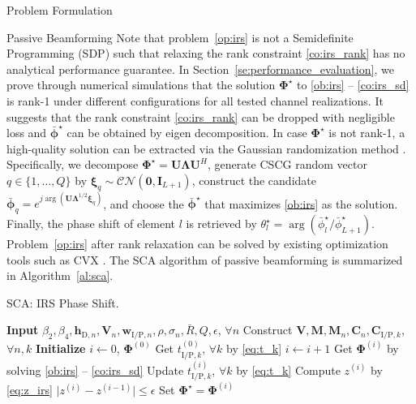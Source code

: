 \documentclass[journal]{IEEEtran}
\begin{document}
\begin{section}{Problem Formulation}
\begin{subsection}{Passive Beamforming}
			Note that problem~\eqref{op:irs} is not a Semidefinite Programming (SDP) such that relaxing the rank constraint \eqref{co:irs_rank} has no analytical performance guarantee. In Section~\ref{se:performance_evaluation}, we prove through numerical simulations that the solution $\boldsymbol{\Phi}^{\star}$ to \ref{ob:irs} -- \ref{co:irs_sd} is rank-\num{1} under different configurations for all tested channel realizations. It suggests that the rank constraint \eqref{co:irs_rank} can be dropped with negligible loss and $\bar{\boldsymbol{\phi}}^\star$ can be obtained by eigen decomposition. In case $\boldsymbol{\Phi}^{\star}$ is not rank-\num{1}, a high-quality solution can be extracted via the Gaussian randomization method \cite{Luo2010}. Specifically, we decompose $\boldsymbol{\Phi}^{\star}=\boldsymbol{U}\boldsymbol{\Lambda}\boldsymbol{U}^H$, generate CSCG random vector $q \in \{1, \dots, Q\}$ by $\boldsymbol{\xi}_q \sim \mathcal{CN}(\boldsymbol{0},\boldsymbol{I}_{L+1})$, construct the candidate $\bar{\boldsymbol{\phi}}_q=e^{j\arg\left(\boldsymbol{U}\boldsymbol{\Lambda}^{1/2}\boldsymbol{\xi}_q\right)}$, and choose the $\bar{\boldsymbol{\phi}}^\star$ that maximizes \eqref{ob:irs} as the solution. Finally, the phase shift of element $l$ is retrieved by $\theta_l^{\star}=\arg(\bar{\phi}_l^\star/\bar{\phi}_{L+1}^\star)$. Problem~\eqref{op:irs} after rank relaxation can be solved by existing optimization tools such as CVX \cite{Grant2013}. The SCA algorithm of passive beamforming is summarized in Algorithm~\ref{al:sca}.
			\begin{algorithm}[!t]
				\caption{SCA: IRS Phase Shift.}
				\label{al:sca}
				\begin{algorithmic}[1]
					\State \textbf{Input} $\beta_2,\beta_4,\boldsymbol{h}_{\mathrm{D},n},\boldsymbol{V}_{n},\boldsymbol{w}_{\mathrm{I/P},n},\rho,\sigma_n,\bar{R},Q,\epsilon$, $\forall n$
					\State Construct $\boldsymbol{V},\boldsymbol{M},\boldsymbol{M}_n,\boldsymbol{C}_{n},\boldsymbol{C}_{\mathrm{I/P},k}$, $\forall n,k$
					\State \textbf{Initialize} $i \gets 0$, $\boldsymbol{\Phi}^{(0)}$
					\State Get $t_{\mathrm{I/P},k}^{(0)}$, $\forall k$ by \eqref{eq:t_k}
					\Repeat
						\State $i \gets i + 1$
						\State Get $\boldsymbol{\Phi}^{(i)}$ by solving \ref{ob:irs} -- \ref{co:irs_sd}
						\State Update $t_{\mathrm{I/P},k}^{(i)}$, $\forall k$ by \eqref{eq:t_k}
						\State Compute $z^{(i)}$ by \eqref{eq:z_irs}
					\Until $\lvert z^{(i)}-z^{(i-1)} \rvert \le \epsilon$
					\State Set $\boldsymbol{\Phi}^{\star}=\boldsymbol{\Phi}^{(i)}$

\end{algorithmic}
\end{algorithm}
\end{subsection}
\end{section}
\end{document}
